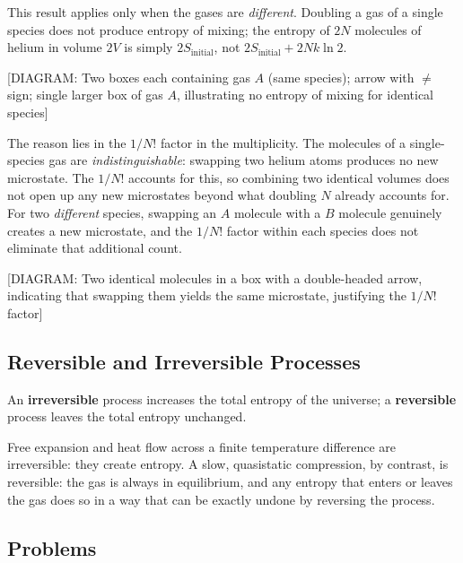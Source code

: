 This result applies only when the gases are \emph{different}. Doubling a gas of a single species
does not produce entropy of mixing; the entropy of $2N$ molecules of helium in volume $2V$ is
simply $2S_{\text{initial}}$, not $2S_{\text{initial}} + 2Nk\ln 2$.

\begin{center}
[DIAGRAM: Two boxes each containing gas $A$ (same species); arrow with $\neq$ sign; single larger
box of gas $A$, illustrating no entropy of mixing for identical species]
\end{center}

The reason lies in the $1/N!$ factor in the multiplicity. The molecules of a single-species gas
are \emph{indistinguishable}: swapping two helium atoms produces no new microstate. The $1/N!$
accounts for this, so combining two identical volumes does not open up any new microstates beyond
what doubling $N$ already accounts for. For two \emph{different} species, swapping an $A$
molecule with a $B$ molecule genuinely creates a new microstate, and the $1/N!$ factor within
each species does not eliminate that additional count.

\begin{center}
[DIAGRAM: Two identical molecules in a box with a double-headed arrow, indicating that swapping
them yields the same microstate, justifying the $1/N!$ factor]
\end{center}

\subsection{Reversible and Irreversible Processes}

\begin{definition}
An \textbf{irreversible} process increases the total entropy of the universe; a \textbf{reversible}
process leaves the total entropy unchanged.
\end{definition}

Free expansion and heat flow across a finite temperature difference are irreversible: they create
entropy. A slow, quasistatic compression, by contrast, is reversible: the gas is always in
equilibrium, and any entropy that enters or leaves the gas does so in a way that can be exactly
undone by reversing the process.


\subsection*{Problems}

